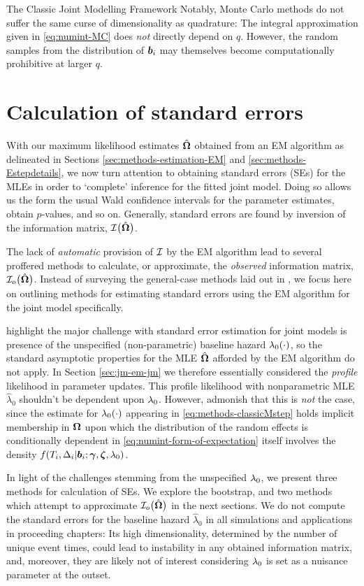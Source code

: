 \begin{chapter}{\label{cha:methods-classic}The Classic Joint Modelling Framework}
Notably, Monte Carlo methods do not suffer the same curse of dimensionality as quadrature: The integral approximation given in \eqref{eq:numint-MC} does \textit{not} directly depend on $q$. However, the random samples from the distribution of $\bm{b}_i$ may themselves become computationally prohibitive at larger $q$.
  
  \section{Calculation of standard errors}\label{sec:methods-SEs}
  With our maximum likelihood estimates $\hat{\bm{\Omega}}$ obtained from an EM algorithm as delineated in Sections \ref{sec:methods-estimation-EM} and \ref{sec:methods-Estepdetails}, we now turn attention to obtaining standard errors (SEs) for the MLEs in order to `complete' inference for the fitted joint model. Doing so allows us the form the usual Wald confidence intervals for the parameter estimates, obtain $p$-values, and so on. Generally, standard errors are found by inversion of the information matrix, $\mathcal{I}\big(\hat{\bm{\Omega}}\big)$. 
  
  The lack of \textit{automatic} provision of $\cal I$ by the EM algorithm lead to several proffered methods to calculate, or approximate, the \textit{observed} information matrix, $\mathcal{I}_o\big(\hat{\bm{\Omega}}\big)$. Instead of surveying the general-case methods laid out in \citet{Mclachlan08}, we focus here on outlining methods for estimating standard errors using the EM algorithm for the joint model specifically.

  \citet{Hsieh2006} highlight the major challenge with standard error estimation for joint models is presence of the unspecified (\ie non-parametric) baseline hazard $\lambda_0\!\left(\cdot\right)$, so the standard asymptotic properties for the MLE $\hat{\bm{\Omega}}$ afforded by the EM algorithm do not apply. In Section \ref{sec:jm-em-jm} we therefore essentially considered the \textit{profile} likelihood in parameter updates. This profile likelihood with nonparametric MLE $\hat{\lambda}_0$ shouldn't be dependent upon $\lambda_0$. However, \citet{Hsieh2006} admonish that this is \textit{not} the case, since the estimate for $\lambda_0\!\left(\cdot\right)$ appearing in \eqref{eq:methods-classicMstep} holds implicit membership in $\bm{\mathrm{\Omega}}$ upon which the distribution of the random effects is conditionally dependent in \eqref{eq:numint-form-of-expectation} \ie itself involves the density $f\!\left( T_i,\Delta_i|\bm{b}_i;\bm{\gamma},\bm{\zeta},\lambda_0\right)$.

  In light of the challenges stemming from the unspecified $\lambda_0$, we present three methods for calculation of SEs. We explore the bootstrap, and two methods which attempt to approximate $\mathcal{I}_o\big(\hat{\bm{\Omega}}\big)$ in the next sections. We do not compute the standard errors for the baseline hazard $\hat{\lambda}_0$ in all simulations and applications in proceeding chapters: Its high dimensionality, determined by the number of unique event times, could lead to instability in any obtained information matrix, and, moreover, they are likely not of interest considering $\lambda_0$ is set as a nuisance parameter at the outset.
  

\end{chapter}
